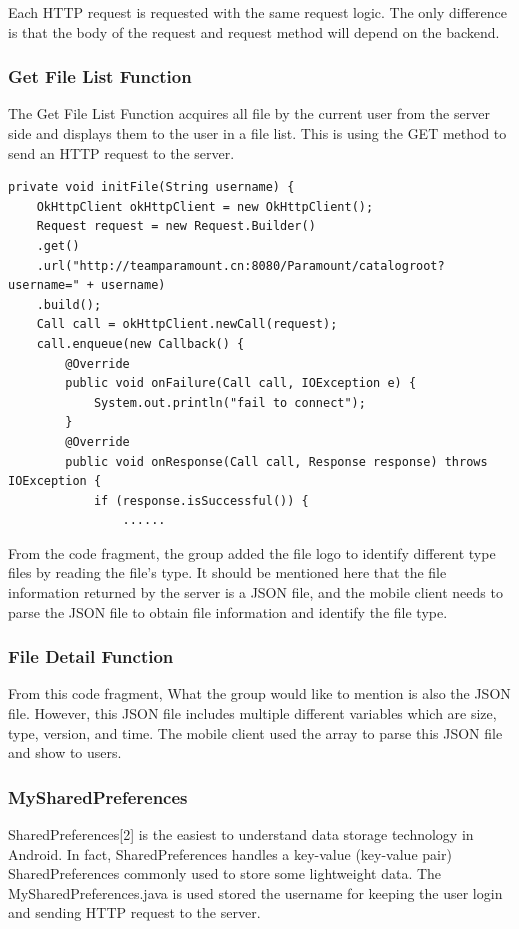 \documentclass[11pt]{article}
\begin{document}
Each HTTP request is requested with the same request logic. The only difference is that the body of the request and request method will depend on the backend.

\subsubsection{Get File List Function}
The Get File List Function acquires all file by the current user from the server side and displays them to the user in a file list. This is using the GET method to send an HTTP request to the server.


\begin{lstlisting}
private void initFile(String username) {
	OkHttpClient okHttpClient = new OkHttpClient();
	Request request = new Request.Builder()
	.get()
	.url("http://teamparamount.cn:8080/Paramount/catalogroot?username=" + username)
	.build();
	Call call = okHttpClient.newCall(request);
	call.enqueue(new Callback() {
		@Override
		public void onFailure(Call call, IOException e) {
			System.out.println("fail to connect");
		}
		@Override
		public void onResponse(Call call, Response response) throws IOException {
			if (response.isSuccessful()) {
				......
\end{lstlisting}

From the code fragment, the group added the file logo to identify different type files by reading the file’s type. It should be mentioned here that the file information returned by the server is a JSON file, and the mobile client needs to parse the JSON file to obtain file information and identify the file type.

\subsubsection{File Detail Function}



From this code fragment, What the group would like to mention is also the JSON file. However, this JSON file includes multiple different variables which are size, type, version, and time. The mobile client used the array to parse this JSON file and show to users.

\subsubsection{MySharedPreferences}
SharedPreferences{[}2{]} is the easiest to understand data storage technology in Android. In fact, SharedPreferences handles a key-value (key-value pair) SharedPreferences commonly used to store some lightweight data. The MySharedPreferences.java is used stored the username for keeping the user login and sending HTTP request to the server. 
\\
\end{document}
